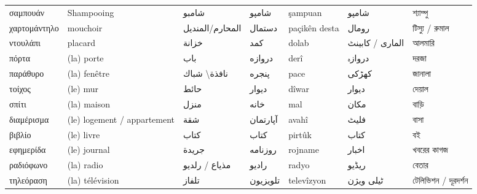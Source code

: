\begin{longtable}{p{3.5cm} p{3.5cm} p{3.5cm} p{3.5cm} p{3.5cm} p{3.5cm} p{3.5cm} }
 σαμπουάν            & Shampooing                  & شامبو                           & شامپو      & şampuan            & شامپو                & শ্যাম্পু                         \\
 χαρτομάντηλο        & mouchoir                    & المحارم/المنديل                 & دستمال     & paçikên desta      & رومال                & টিস্যু / রুমাল                   \\
 ντουλάπι            & placard                     & خزانة                           & کمد        & dolab              & الماری / کابینٹ      & আলমারি                           \\
 πόρτα               & (la) porte                  & باب                             & دروازه     & derî               & دروازہ               & দরজা                             \\
 παράθυρο            & (la) fenêtre                & نافذة\textbackslash{} شباك                     & پنجره      & pace               & کهڑکی                & জানালা                           \\
 τοίχος              & (le) mur                    & حائط                            & دیوار      & dîwar              & دیوار                & দেয়াল                            \\
 σπίτι               & (la) maison                 & منزل                            & خانه       & mal                & مکان                 & বাড়ি                             \\
 διαμέρισμα          & (le) logement / appartement & شقة                             & آپارتمان   & avahî              & فلیٹ                 & বাসা                             \\
 βιβλίο              & (le) livre                  & كتاب                            & کتاب       & pirtûk             & کتاب                 & বই                               \\
 εφημερίδα           & (le) journal                & جريدة                           & روزنامه    & rojname            & اخبار                & খবরের কাগজ                       \\
 ραδιόφωνο           & (la) radio                  & مذياع      / رلديو              & رادیو      & radyo              & ریڈیو                & বেতার                            \\
 τηλεόραση           & (la) télévision             & تلفاز                           & تلویزیون   & televîzyon         & ٹیلی ویژن            & টেলিভিশন / দূরদর্শন              \\
\midrule
\bottomrule
\end{longtable}

